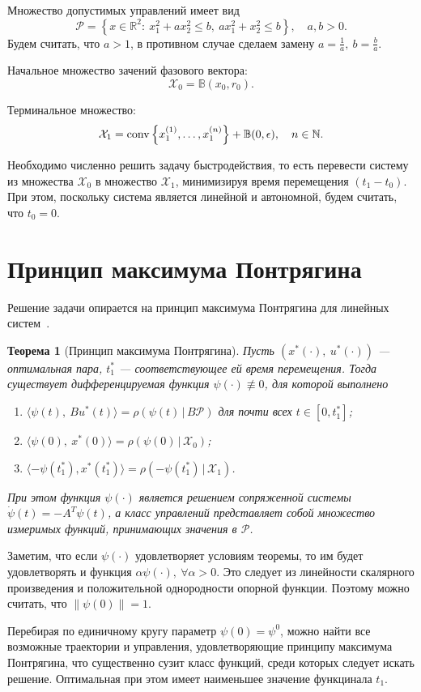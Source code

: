 \documentclass[11pt]{article}
\newtheorem{Th}{Теорема}
\newcommand\Real{\mathbb{R}}
\newcommand\PS{\mathcal{P}}
\newcommand\X{\mathcal{X}}
\newcommand\Sup[2]{\rho( #1 \, | \, #2 )}
\newcommand\Conv[1]{{\rm conv}\left\{ #1 \right\}}
\begin{document}
Множество допустимых управлений имеет вид 
$$ \PS = \left\{ x \in \Real^2 \colon \ x_1^2 + a x_2^2 \leq b, \ ax_1^2 + x_2^2 \leq b \right\}, \quad a,b > 0.$$
Будем считать, что $a > 1$, в противном случае сделаем замену $a = \frac{1}{a}, \ b = \frac{b}{a}$.

Начальное множество зачений фазового вектора: $$\X_0 = \mathbb{B}(x_0, r_0).$$

Терминальное множество: $$\X_1 = \Conv{x_1^{\left(1\right)}, \ldots, x_1^{\left(n\right)}} + \mathbb{B}(0, \epsilon), \quad n \in \mathbb{N}.$$

Необходимо численно решить задачу быстродействия, то есть перевести систему из множества $\X_0$ в множество $\X_1$,
минимизируя время перемещения $(t_1 - t_0)$. При этом, поскольку система является линейной и автономной, будем считать, что $t_0 = 0$.


\newpage
\section{Принцип максимума Понтрягина}
Решение задачи опирается на принцип максимума Понтрягина для линейных систем~\cite{rublev}.
\begin{Th}[Принцип максимума Понтрягина] \label{PMP}
Пусть $(x^*(\cdot), \ u^*(\cdot))$ --- оптимальная пара, $t_1^*$ --- соответствующее ей время перемещения. Тогда существует дифференцируемая функция 
$\psi(\cdot) \not\equiv 0$, для которой выполнено
\begin{enumerate}
\item $\langle \psi(t), \ Bu^*(t) \rangle = \Sup{\psi(t)}{B \PS}$ для почти всех $t \in [0, t_1^*]$; 
\item $\langle \psi(0), \ x^*(0) \rangle = \Sup{\psi(0)}{\X_0}$;
\item $\langle -\psi(t_1^*), x^*(t_1^*) \rangle = \Sup{-\psi(t_1^*)}{\X_1}$.
\end{enumerate}
При этом функция $\psi(\cdot)$ является решением сопряженной системы $\dot \psi(t) = -A^T\psi(t)$, а
класс управлений представляет собой множество измеримых функций, принимающих значения в $\PS$.
\end{Th}
 
Заметим, что если $\psi(\cdot)$ удовлетворяет условиям теоремы, то им будет удовлетворять и функция 
$\alpha \psi(\cdot), \ \forall \alpha > 0$. Это следует из линейности скалярного произведения и 
положительной однородности опорной функции. Поэтому можно считать, что $\|\psi(0)\| = 1$.

Перебирая по единичному кругу параметр $\psi(0) = \psi^0$, можно найти все возможные траектории 
и управления, удовлетворяющие принципу максимума Понтрягина, что существенно
сузит класс функций, среди которых следует искать решение. Оптимальная при этом 
имеет наименьшее значение функцинала $t_1$.
\end{document}
